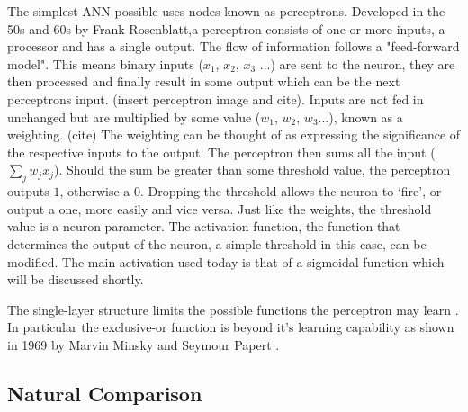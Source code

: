 The simplest ANN possible uses nodes known as perceptrons\citep{mo2012survey}. 
Developed in the 50s and 60s by Frank Rosenblatt,a perceptron consists of one or more inputs, a processor and has a single output\citep{mo2012survey}. 
The flow of information follows a "feed-forward model".
This means binary inputs ($x_1$, $x_2$, $x_3$ ...) are sent to the neuron, they are then processed and finally result in some output which can be the next perceptrons input.
(insert perceptron image and cite). 
Inputs are not fed in unchanged but are multiplied by some value ($w_1$, $w_2$, $w_3$...), known as a weighting. (cite)
The weighting can be thought of as expressing the significance of the respective inputs to the output.
The perceptron then sums all the input ($\sum_j w_j x_j$).
Should the sum be greater than some threshold value, the perceptron outputs $1$, otherwise a $0$.
Dropping the threshold allows the neuron to `fire', or output a one, more easily and vice versa.
Just like the weights, the threshold value is a neuron parameter.
The activation function, the function that determines the output of the neuron, a simple threshold in this case, can be modified.
The main activation used today is that of a sigmoidal function which will be discussed shortly.

The single-layer structure limits the possible functions the perceptron may learn \citep{mo2012survey}.
In particular the exclusive-or function is beyond it's learning capability as shown in 1969 by Marvin Minsky and Seymour Papert \citep{minsky1969perceptrons}.


		\subsection{Natural Comparison}

